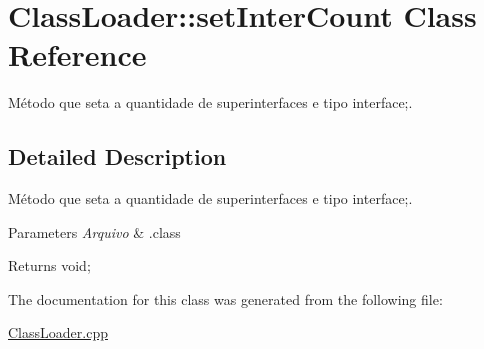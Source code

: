 \hypertarget{class_class_loader_1_1set_inter_count}{}\section{Class\+Loader\+:\+:set\+Inter\+Count Class Reference}
\label{class_class_loader_1_1set_inter_count}


Método que seta a quantidade de superinterfaces e tipo interface;.  




\subsection{Detailed Description}
Método que seta a quantidade de superinterfaces e tipo interface;. 


\begin{DoxyParams}{Parameters}
{\em Arquivo} & .class \\
\hline
\end{DoxyParams}
\begin{DoxyReturn}{Returns}
void; 
\end{DoxyReturn}


The documentation for this class was generated from the following file\+:\begin{DoxyCompactItemize}
\item 
\hyperlink{_class_loader_8cpp}{Class\+Loader.\+cpp}\end{DoxyCompactItemize}
